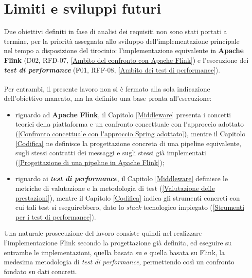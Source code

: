\section{Limiti e sviluppi futuri}
\label{Limiti e sviluppi futuri}
Due obiettivi definiti in fase di analisi dei requisiti non sono stati portati a termine, per la priorità assegnata allo sviluppo dell'implementazione principale nel tempo a disposizione del tirocinio: l'implementazione equivalente in \textbf{Apache Flink} (D02, RFD-07, \ref{Ambito del confronto con Apache Flink}) e l'esecuzione dei \textit{\textbf{test di performance}} (F01, RFF-08, \ref{Ambito dei test di performance}). \\ \\
Per entrambi, il presente lavoro non si è fermato alla sola indicazione dell'obiettivo mancato, ma ha definito una base pronta all'esecuzione:
\begin{itemize}
    \item riguardo ad \textbf{Apache Flink}, il Capitolo \ref{Middleware} presenta i concetti teorici della piattaforma e un confronto concettuale con l'approccio  adottato (\ref{Confronto concettuale con l'approccio Spring adottato}), mentre il Capitolo \ref{Codifica} ne definisce la progettazione concreta di una pipeline equivalente, sugli stessi contratti dei messaggi e sugli stessi \textit{} già implementati (\ref{Progettazione di una pipeline in Apache Flink});
    \item riguardo ai \textit{\textbf{test di performance}}, il Capitolo \ref{Middleware} definisce le metriche di valutazione e la metodologia di test (\ref{Valutazione delle prestazioni}), mentre il Capitolo \ref{Codifica} indica gli strumenti concreti con cui tali test si eseguirebbero, dato lo \textit{stack} tecnologico impiegato (\ref{Strumenti per i test di performance}).
\end{itemize}
Una naturale prosecuzione del lavoro consiste quindi nel realizzare l'implementazione Flink secondo la progettazione già definita, ed eseguire su entrambe le implementazioni, quella basata su  e quella basata su Flink, la medesima metodologia di \textit{test di performance}, permettendo così un confronto fondato su dati concreti.

\newpage
